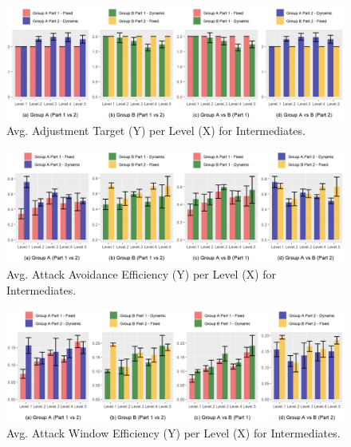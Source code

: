 \begin{figure}[!ht]
    \begin{center}
    \caption{Avg. Adjustment Target (Y) per Level (X) for Intermediates.}
        \includegraphics[width=34em]{figures/adjustment_target_level-intermediate_players.png}
    \end{center}
    \label{fig:result-metric-intermediate-adjustment-target-level}
\end{figure}

\begin{figure}[!ht]
    \begin{center}
    \caption{Avg. Attack Avoidance Efficiency (Y) per Level (X) for Intermediates.}
        \includegraphics[width=34em]{figures/attack_avoidance_efficiency-intermediate_players.png}
    \end{center}
    \label{fig:result-metric-intermediates-attack-avoidance-efficiency}
\end{figure}

\begin{figure}[!ht]
    \begin{center}
    \caption{Avg. Attack Window Efficiency (Y) per Level (X) for Intermediates.}
        \includegraphics[width=34em]{figures/attack_window_efficiency-intermediate_players.png}
    \end{center}
    \label{fig:result-metric-intermediates-attack-window-efficiency}
\end{figure}

